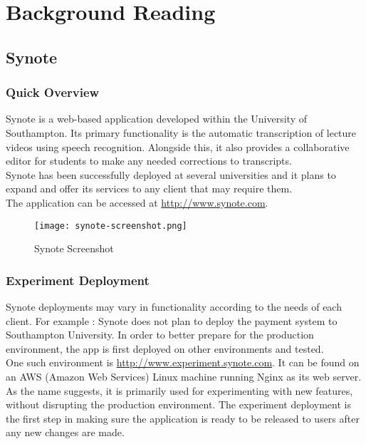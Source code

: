 \chapter{Background Reading}
\label{chap:background-reading}

\section{Synote}
\label{sec:synote}

\subsection{Quick Overview}
\label{subsec:quick-overview}
Synote is a web-based application developed within the University of Southampton. Its primary functionality is the automatic transcription of lecture videos using speech recognition. Alongside this, it also provides a collaborative editor for students to make any needed corrections to transcripts. \\

Synote has been successfully deployed at several universities and it plans to expand and offer its services to any client that may require them. \\

The application can be accessed at \url{http://www.synote.com}. \\

\begin{figure}[!hbt]
  	\centering
 	\texttt{[image: synote-screenshot.png]}
  	\caption{Synote Screenshot}
 	\label{fig:synote-screenshot}
\end{figure}

\subsection{Experiment Deployment}
\label{subsec:experiment-deployment}

Synote deployments may vary in functionality according to the needs of each client. For example : Synote does not plan to deploy the payment system to Southampton University. In order to better prepare for the production environment, the app is first deployed on other environments and tested. \\

One such environment is \url{http://www.experiment.synote.com}. It can be found on an AWS (Amazon Web Services) Linux machine running Nginx as its web server. As the name suggests, it is primarily used for experimenting with new features, without disrupting the production environment. The experiment deployment is the first step in making sure the application is ready to be released to users after any new changes are made. \\

